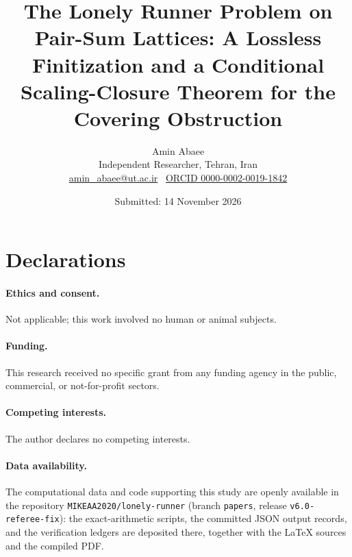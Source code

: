 \documentclass[11pt,a4paper]{article}
\numberwithin{equation}{section}
\theoremstyle{plain}
\newcommand{\papertitle}{The Lonely Runner Problem on Pair-Sum Lattices: A Lossless Finitization and a Conditional Scaling-Closure Theorem for the Covering Obstruction}
\begin{document}
\title{\papertitle}
\author{Amin Abaee\\[2pt] {\small Independent Researcher, Tehran, Iran}\\[1pt] {\small \href{mailto:amin_abaee@ut.ac.ir}{amin\_abaee@ut.ac.ir} \textbullet\ \href{https://orcid.org/0000-0002-0019-1842}{ORCID 0000-0002-0019-1842}}}
\date{Submitted: 14 November 2026}
\maketitle

\tableofcontents
\clearpage
















\section*{Declarations}

\paragraph{Ethics and consent.} Not applicable; this work involved no
human or animal subjects.

\paragraph{Funding.} This research received no specific grant from any
funding agency in the public, commercial, or not-for-profit sectors.

\paragraph{Competing interests.} The author declares no competing
interests.

\paragraph{Data availability.} The computational data and code
supporting this study are openly available in the repository
\texttt{MIKEAA2020/lonely-runner} (branch \texttt{papers}, release
\texttt{v6.0-referee-fix}): the exact-arithmetic scripts, the committed
JSON output records, and the verification ledgers are deposited there,
together with the \LaTeX{} sources and the compiled PDF.
\end{document}
